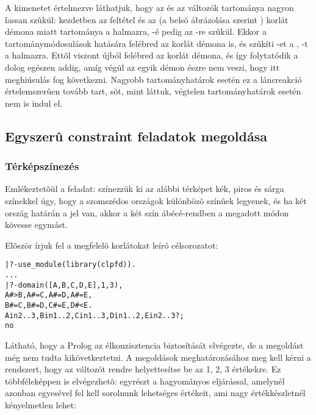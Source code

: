 A kimenetet értelmezve láthatjuk, hogy az  és az  változók
tartománya nagyon lassan szûkül: kezdetben az  feltétel
és az  (a \clpfd belsõ ábrázolása szerint )
korlát démona miatt  tartománya a  halmazra, -é pedig
az -re szûkül. Ekkor a tartománymódosulások hatására felébred
az  korlát démona is, és szûkíti -et a , -t
a  halmazra. Ettõl viszont újból felébred az  korlát
démona, és így folytatódik a dolog egészen addig, amíg végül az egyik
démon észre nem veszi, hogy itt meghiúsulás fog következni. Nagyobb
tartományhatárok esetén ez a láncreakció értelemszerûen tovább tart, sõt,
mint láttuk, végtelen tartományhatárok esetén nem is indul el.

\subsection{Egyszerû constraint feladatok megoldása}

\subsubsection{Térképszínezés}

Emlékeztetõül a feladat: színezzük ki az alábbi térképet kék, piros és
sárga színekkel úgy, hogy a szomszédos országok különbözõ színûek legyenek,
és ha két ország határán a \cd{<} jel van, akkor a két szín ábécé-rendben
a megadott módon kövesse egymást.

\begin{center}\end{center}

Elõször írjuk fel a megfelelõ korlátokat leíró \clpfd célsorozatot:

\begin{alltt}
| ?- use_module(library(clpfd)).
...
| ?- domain([A,B,C,D,E], 1, 3), 
     A #> B, A #\bs= C, A #\bs= D, A #\bs= E,
     B #\bs= C, B #\bs= D, C #\bs= E, D #< E.
A in 2..3, B in 1..2, C in 1..3, D in 1..2, E in 2..3 ? ;
no
\end{alltt}

Látható, hogy a Prolog az élkonzisztencia biztosítását elvégezte, de a
megoldást még nem tudta kikövetkeztetni. A megoldások meghatározásához
meg kell kérni a rendszert, hogy az  változót rendre helyettesítse
be az 1, 2, 3 értékekre. Ez többféleképpen is elvégezhetõ: egyrészt a
hagyományos  eljárással, amelynél azonban egyesével fel kell
sorolnunk  lehetséges értékeit, ami nagy értékkészletnél kényelmetlen
lehet:

